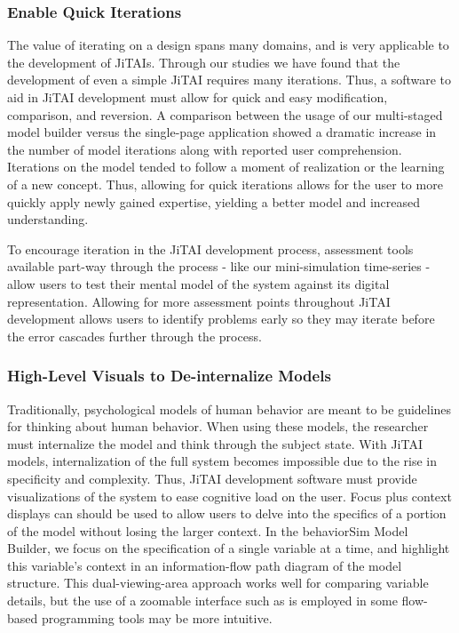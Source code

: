 \documentclass{sigchi}
\begin{document}
\subsubsection{Enable Quick Iterations}
The value of iterating on a design spans many domains, and is very applicable to the development of JiTAIs. 
Through our studies we have found that the development of even a simple JiTAI requires many iterations.
Thus, a software to aid in JiTAI development must allow for quick and easy modification, comparison, and reversion.
A comparison between the usage of our multi-staged model builder versus the single-page application showed a dramatic increase in the number of model iterations along with reported user comprehension.
Iterations on the model tended to follow a moment of realization or the learning of a new concept.
Thus, allowing for quick iterations allows for the user to more quickly apply newly gained expertise, yielding a better model and increased understanding.

To encourage iteration in the JiTAI development process, assessment tools available part-way through the process - like our mini-simulation time-series - allow users to test their mental model of the system against its digital representation.
Allowing for more assessment points throughout JiTAI development allows users to identify problems early so they may iterate before the error cascades further through the process.

\subsubsection{High-Level Visuals to De-internalize Models}
Traditionally, psychological models of human behavior are meant to be guidelines for thinking about human behavior.
When using these models, the researcher must internalize the model and think through the subject state.
With JiTAI models, internalization of the full system becomes impossible due to the rise in specificity and complexity.
Thus, JiTAI development software must provide visualizations of the system to ease cognitive load on the user.
Focus plus context displays \cite{baudisch2001focus} can should be used to allow users to delve into the specifics of a portion of the model without losing the larger context. 
In the behaviorSim Model Builder, we focus on the specification of a single variable at a time, and highlight this variable’s context in an information-flow path diagram of the model structure.
This dual-viewing-area approach works well for comparing variable details, but the use of a zoomable interface such as is employed in some flow-based programming \cite{morrison2010flow} tools may be more intuitive.
\end{document}
